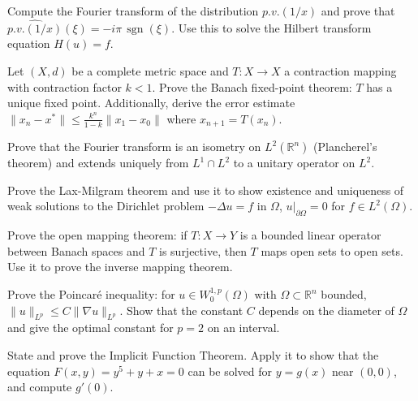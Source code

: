 \documentclass[12pt,a4paper]{exam}
\begin{document}
\begin{questions}
\vspace{0.3cm}

\question[5]
Compute the Fourier transform of the distribution $p.v.(1/x)$ and prove that $\widehat{p.v.(1/x)}(\xi) = -i\pi \, \operatorname{sgn}(\xi)$. Use this to solve the Hilbert transform equation $H(u) = f$.

\vspace{0.3cm}

\question[3]
Let $(X, d)$ be a complete metric space and $T: X \to X$ a contraction mapping with contraction factor $k < 1$. Prove the Banach fixed-point theorem: $T$ has a unique fixed point. Additionally, derive the error estimate $\|x_n - x^*\| \leq \frac{k^n}{1-k} \|x_1 - x_0\|$ where $x_{n+1} = T(x_n)$.

\vspace{0.3cm}

\question[3]
Prove that the Fourier transform is an isometry on $L^2(\mathbb{R}^n)$ (Plancherel's theorem) and extends uniquely from $L^1 \cap L^2$ to a unitary operator on $L^2$.

\vspace{0.3cm}

\question[3]
Prove the Lax-Milgram theorem and use it to show existence and uniqueness of weak solutions to the Dirichlet problem $-\Delta u = f$ in $\Omega$, $u|_{\partial\Omega} = 0$ for $f \in L^2(\Omega)$.

\vspace{0.3cm}

\question[4]
Prove the open mapping theorem: if $T: X \to Y$ is a bounded linear operator between Banach spaces and $T$ is surjective, then $T$ maps open sets to open sets. Use it to prove the inverse mapping theorem.

\vspace{0.3cm}

\question[4]
Prove the Poincar\'e inequality: for $u \in W_0^{1,p}(\Omega)$ with $\Omega \subset \mathbb{R}^n$ bounded, $\|u\|_{L^p} \leq C \|\nabla u\|_{L^p}$. Show that the constant $C$ depends on the diameter of $\Omega$ and give the optimal constant for $p=2$ on an interval.

\vspace{0.3cm}

\question[6]
State and prove the Implicit Function Theorem. Apply it to show that the equation $F(x,y) = y^5 + y + x = 0$ can be solved for $y = g(x)$ near $(0,0)$, and compute $g'(0)$.

\vspace{0.3cm}


\end{questions}
\end{document}
